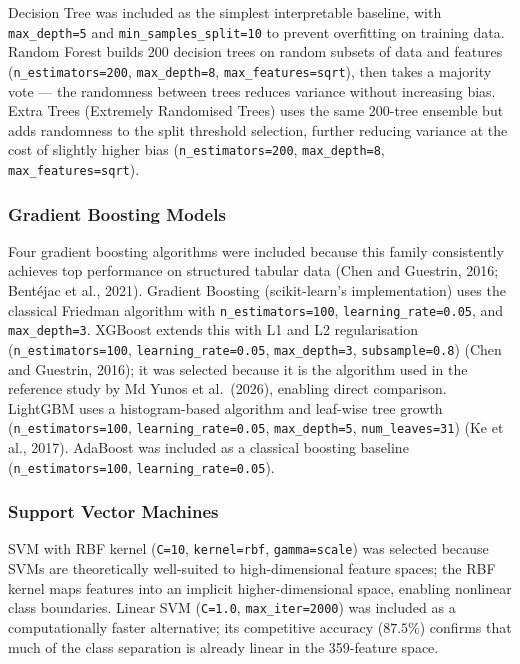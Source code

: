 \documentclass[12pt, oneside]{article} %
\begin{document}
Decision Tree was included as the simplest interpretable baseline, with \texttt{max\_depth=5} and \texttt{min\_samples\_split=10} to prevent overfitting on training data. Random Forest builds 200 decision trees on random subsets of data and features (\texttt{n\_estimators=200}, \texttt{max\_depth=8}, \texttt{max\_features=sqrt}), then takes a majority vote --- the randomness between trees reduces variance without increasing bias. Extra Trees (Extremely Randomised Trees) uses the same 200-tree ensemble but adds randomness to the split threshold selection, further reducing variance at the cost of slightly higher bias (\texttt{n\_estimators=200}, \texttt{max\_depth=8}, \texttt{max\_features=sqrt}).

\subsubsection{Gradient Boosting Models}

Four gradient boosting algorithms were included because this family consistently achieves top performance on structured tabular data (Chen and Guestrin, 2016; Bent\'{e}jac et al., 2021). Gradient Boosting (scikit-learn's implementation) uses the classical Friedman algorithm with \texttt{n\_estimators=100}, \texttt{learning\_rate=0.05}, and \texttt{max\_depth=3}. XGBoost extends this with L1 and L2 regularisation (\texttt{n\_estimators=100}, \texttt{learning\_rate=0.05}, \texttt{max\_depth=3}, \texttt{subsample=0.8}) (Chen and Guestrin, 2016); it was selected because it is the algorithm used in the reference study by Md Yunos et al.\ (2026), enabling direct comparison. LightGBM uses a histogram-based algorithm and leaf-wise tree growth (\texttt{n\_estimators=100}, \texttt{learning\_rate=0.05}, \texttt{max\_depth=5}, \texttt{num\_leaves=31}) (Ke et al., 2017). AdaBoost was included as a classical boosting baseline (\texttt{n\_estimators=100}, \texttt{learning\_rate=0.05}).

\subsubsection{Support Vector Machines}

SVM with RBF kernel (\texttt{C=10}, \texttt{kernel=rbf}, \texttt{gamma=scale}) was selected because SVMs are theoretically well-suited to high-dimensional feature spaces; the RBF kernel maps features into an implicit higher-dimensional space, enabling nonlinear class boundaries. Linear SVM (\texttt{C=1.0}, \texttt{max\_iter=2000}) was included as a computationally faster alternative; its competitive accuracy ($87.5\%$) confirms that much of the class separation is already linear in the 359-feature space.
\end{document}
